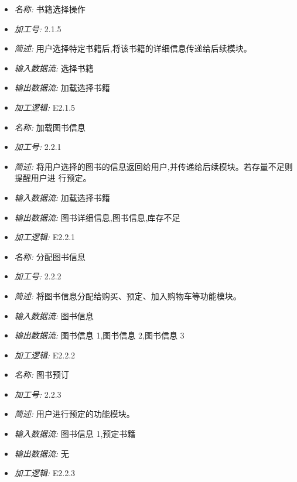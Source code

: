 \documentclass{article}
\begin{document}
\begin{CJK*}{UTF8}{gbsn}
\begin{itemize}
\end{itemize}


\vspace{-1mm}


\begin{itemize}
\item \textit{名称: }书籍选择操作
\item \textit{加工号: }2.1.5 
\item \textit{简述: }用户选择特定书籍后,将该书籍的详细信息传递给后续模块。 
\item \textit{输入数据流: }选择书籍
\item \textit{输出数据流: }加载选择书籍
\item \textit{加工逻辑: }E2.1.5

\end{itemize}


\vspace{-1mm}


\begin{itemize}
\item \textit{名称: }加载图书信息
\item \textit{加工号: }2.2.1 
\item \textit{简述: }将用户选择的图书的信息返回给用户,并传递给后续模块。若存量不足则提醒用户进 行预定。
\item \textit{输入数据流: }加载选择书籍
\item \textit{输出数据流: }图书详细信息,图书信息,库存不足
\item \textit{加工逻辑: }E2.2.1

\end{itemize}


\vspace{-1mm}


\begin{itemize}
\item \textit{名称: }分配图书信息
\item \textit{加工号: }2.2.2 
\item \textit{简述: }将图书信息分配给购买、预定、加入购物车等功能模块。 
\item \textit{输入数据流: }图书信息
\item \textit{输出数据流: }图书信息 1,图书信息 2,图书信息 3 
\item \textit{加工逻辑: }E2.2.2

\end{itemize}


\vspace{-1mm}


\begin{itemize}
\item \textit{名称: }图书预订
\item \textit{加工号: }2.2.3 
\item \textit{简述: }用户进行预定的功能模块。 
\item \textit{输入数据流: }图书信息 1,预定书籍 
\item \textit{输出数据流: }无
\item \textit{加工逻辑: }E2.2.3


\end{itemize}
\end{CJK*}
\end{document}
